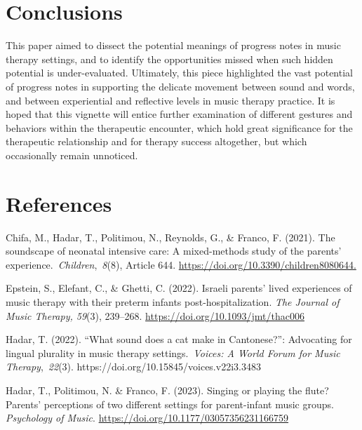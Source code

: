 \documentclass[authordate, empirical]{jote-new-article}
\begin{document}
	\section{Conclusions}



	This paper aimed to dissect the potential meanings of progress notes in music therapy settings, and to identify the opportunities missed when such hidden potential is under-evaluated. Ultimately, this piece highlighted the vast potential of progress notes in supporting the delicate movement between sound and words, and between experiential and reflective levels in music therapy practice. It is hoped that this vignette will entice further examination of different gestures and behaviors within the therapeutic encounter, which hold great significance for the therapeutic relationship and for therapy success altogether, but which occasionally remain unnoticed.







	\section{References}



	Chifa, M., Hadar, T., Politimou, N., Reynolds, G., \& Franco, F. (2021). The soundscape of neonatal intensive care: A mixed-methods study of the parents' experience. \emph{Children}, \emph{8}(8), Article 644. \href{https://doi.org/10.3390/children8080644}{https://doi.org/10.3390/children8080644}\underline{.}



	 Epstein, S., Elefant, C., \& Ghetti, C. (2022). Israeli parents' lived experiences of music therapy with their preterm infants post-hospitalization. \emph{The Journal of Music Therapy, 59}(3), 239--268. \href{https://doi.org/10.1093/jmt/thac006}{https://doi.org/10.1093/jmt/thac006}



	Hadar, T. (2022). “What sound does a cat make in Cantonese?”: Advocating for lingual plurality in music therapy settings. \emph{Voices: A World Forum for Music Therapy}, \emph{22}(3). https://doi.org/10.15845/voices.v22i3.3483



	Hadar, T., Politimou, N. \& Franco, F. (2023). Singing or playing the flute? Parents' perceptions of two different settings for parent-infant music groups. \emph{Psychology of Music}. \href{https://doi.org/10.1177/03057356231166759}{https://doi.org/10.1177/03057356231166759}
\end{document}
